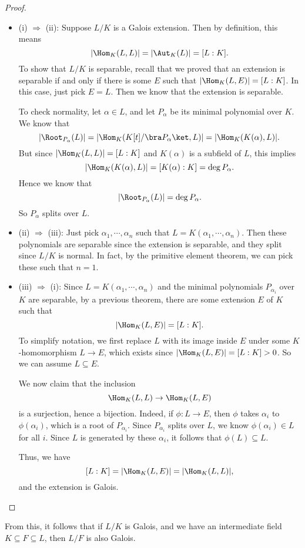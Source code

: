 \documentclass[a4paper]{article}
\begin{document}
\begin{proof}\leavevmode
  \begin{itemize}
    \item (i) $\Rightarrow$ (ii): Suppose $L/K$ is a Galois extension. Then by definition, this means
      \[
        |\Hom_K(L, L)| = |\Aut_K(L)| = [L:K].
      \]
      To show that $L/K$ is separable, recall that we proved that an extension is separable if and only if there is some $E$ such that $|\Hom_K(L, E)| = [L:K]$. In this case, just pick $E = L$. Then we know that the extension is separable.

      To check normality, let $\alpha \in L$, and let $P_\alpha$ be its minimal polynomial over $K$. We know that
      \[
        |\Root_{P_\alpha}(L)| = |\Hom_K(K[t]/\bra P_\alpha\ket, L)| = |\Hom_K(K(\alpha), L)|.
      \]
      But since $|\Hom_K(L, L)| = [L:K]$ and $K(\alpha)$ is a subfield of $L$, this implies
      \[
        |\Hom_K(K(\alpha), L)| = [K(\alpha): K] = \deg P_\alpha.
      \]
      Hence we know that
      \[
        |\Root_{P_\alpha}(L)| = \deg P_\alpha.
      \]
      So $P_\alpha$ splits over $L$.
    \item (ii) $\Rightarrow$ (iii): Just pick $\alpha_1, \cdots, \alpha_n$ such that $L = K(\alpha_1, \cdots, \alpha_n)$. Then these polynomials are separable since the extension is separable, and they split since $L/K$ is normal. In fact, by the primitive element theorem, we can pick these such that $n = 1$.

    \item (iii) $\Rightarrow$ (i): Since $L = K(\alpha_1, \cdots, \alpha_n)$ and the minimal polynomials $P_{\alpha_i}$ over $K$ are separable, by a previous theorem, there are some extension $E$ of $K$ such that
      \[
        |\Hom_K(L, E)| = [L:K].
      \]
      To simplify notation, we first replace $L$ with its image inside $E$ under some $K$-homomorphism $L \to E$, which exists since $|\Hom_K(L, E)| = [L:K] > 0$. So we can assume $L\subseteq E$.

      We now claim that the inclusion
      \[
        \Hom_K(L, L) \to \Hom_K(L, E)
      \]
      is a surjection, hence a bijection. Indeed, if $\phi: L \to E$, then $\phi$ takes $\alpha_i$ to $\phi(\alpha_i)$, which is a root of $P_{\alpha_i}$. Since $P_{\alpha_i}$ splits over $L$, we know $\phi(\alpha_i) \in L$ for all $i$. Since $L$ is generated by these $\alpha_i$, it follows that $\phi(L) \subseteq L$.

      Thus, we have
      \[
        [L:K] = |\Hom_K(L, E)| = |\Hom_K(L, L)|,
      \]
      and the extension is Galois.
  \end{itemize}
\end{proof}
From this, it follows that if $L/K$ is Galois, and we have an intermediate field $K\subseteq F \subseteq L$, then $L/F$ is also Galois.
\end{document}
